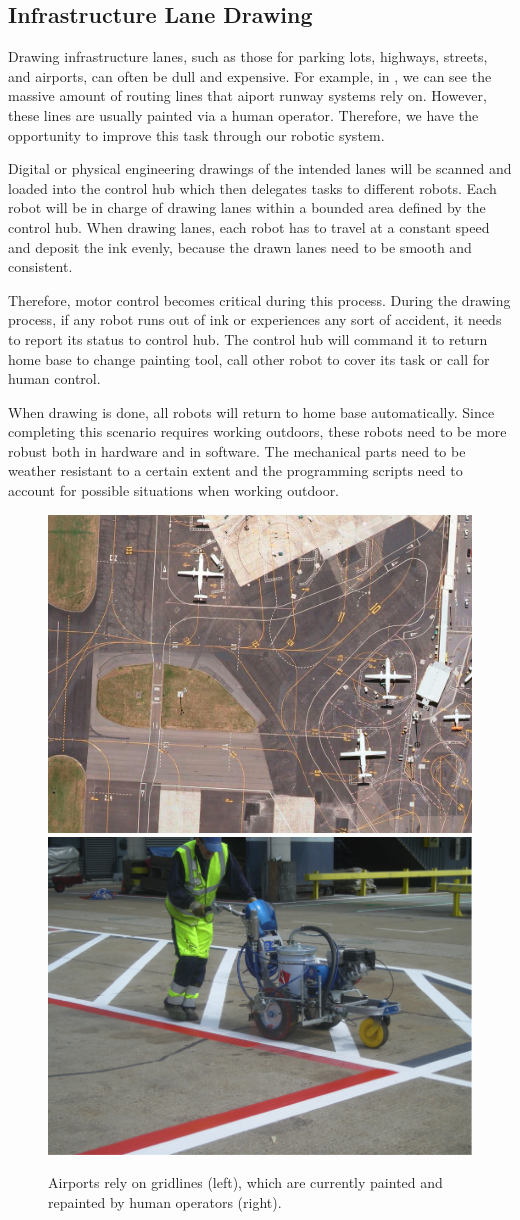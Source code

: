 \subsection{Infrastructure Lane Drawing}
Drawing infrastructure lanes, such as those for parking lots, highways, streets, and airports, can often be dull and expensive. For example, in , we can see the massive amount of routing lines that aiport runway systems rely on. However, these lines are usually painted via a human operator. Therefore, we have the opportunity to improve this task through our robotic system. 

Digital or physical engineering drawings of the intended lanes will be scanned and loaded into the control hub which then delegates tasks to different robots. Each robot will be in charge of drawing lanes within a bounded area defined by the control hub. When drawing lanes, each robot has to travel at a constant speed and deposit the ink evenly, because the drawn lanes need to be smooth and consistent. 

Therefore, motor control becomes critical during this process. During the drawing process, if any robot runs out of ink or experiences any sort of accident, it needs to report its status to control hub. The control hub will command it to return home base to change painting tool, call other robot to cover its task or call for human control. 

When drawing is done, all robots will return to home base automatically. Since completing this scenario requires working outdoors, these robots need to be more robust both in hardware and in software. The mechanical parts need to be weather resistant to a certain extent and the programming scripts need to account for possible situations when working outdoor. 

\begin{figure}
 \centering
 \includegraphics[width=0.48\columnwidth]{figs/airport_layout.jpg}
 \includegraphics[width=0.48\columnwidth]{figs/airport_painter.png}
 \caption{Airports rely on gridlines (left), which are currently painted and repainted by human operators (right).}
 \label{fig:airport}
\end{figure}


